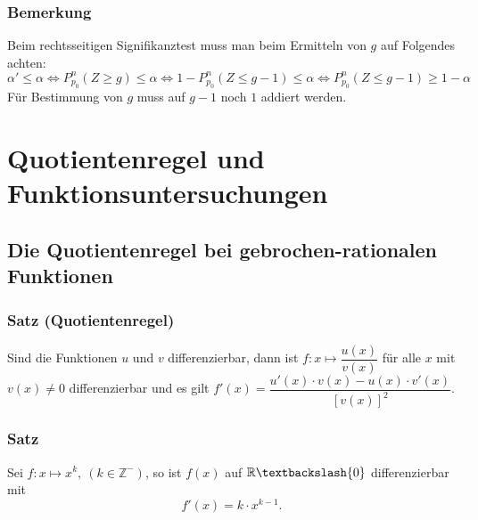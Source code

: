 \documentclass[a4paper,12pt]{article}
\newcommand{\Z}{\mathbb{Z}}
\newcommand{\R}{\mathbb{R}}
\begin{document}
\subsubsection{Bemerkung}
Beim rechtsseitigen Signifikanztest muss man beim Ermitteln von $g$ auf Folgendes achten: 
\[ \alpha' \leq \alpha \Leftrightarrow P_{p_0}^n(Z\geq g) \leq \alpha \Leftrightarrow 1-P_{p_0}^n(Z\leq g - 1) \leq \alpha \Leftrightarrow P_{p_0}^n (Z\leq g - 1) \geq 1 - \alpha  \]
Für Bestimmung von $g$ muss auf $g-1$ noch $1$ addiert werden. 


\newpage
\section{Quotientenregel und Funktionsuntersuchungen}
\subsection{Die Quotientenregel bei gebrochen-rationalen Funktionen}
\subsubsection{Satz (Quotientenregel)}
Sind die Funktionen $u$ und $v$ differenzierbar, dann ist $f:x\mapsto \dfrac{u(x)}{v(x)}$ für alle $x$ mit $v(x) \neq 0$ differenzierbar und es gilt $f'(x)=\dfrac{u'(x)\cdot v(x)-u(x)\cdot v'(x)}{[ v(x) ]^2}$.

\subsubsection{Satz}
Sei $f:x\mapsto x^k, \ (k\in\Z^-)$, so ist $f(x)$ auf $\R\textbackslash \{ 0 \}$ differenzierbar mit
\[ f'(x)= k\cdot x^{k-1} \text{.}\]
\end{document}

